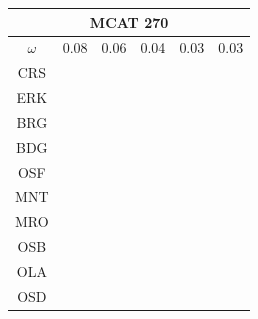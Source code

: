 \documentclass[12pt]{article}
\begin{document}
\begin{landscape}
\begin{figure}
{\begin{minipage}[c]{0.3\textwidth}
\begin{tabular}{|c|c|c|c|c|c|}
\end{tabular}
\end{minipage}
\begin{minipage}[c]{0.3\textwidth}                                                                                                                         
\begin{tabular}{|c|c|c|c|c|c|}                                                                                                        
         \hline \multicolumn{6}{|c|}{MCAT 270} \\ \hline                                                                              
         $\omega$&0.08&0.06&0.04&0.03&0.03 \\ \hline                                                                                  
        CRS&\cellcolor[HTML]{E41A1C}&\cellcolor[HTML]{E41A1C}&\cellcolor[HTML]{E41A1C}&\cellcolor[HTML]{E41A1C}&\cellcolor[HTML]{E41A1C} \\ \hline
        ERK&\cellcolor[HTML]{E41A1C}&\cellcolor[HTML]{E41A1C}&\cellcolor[HTML]{E41A1C}&\cellcolor[HTML]{E41A1C}&\cellcolor[HTML]{E41A1C} \\ \hline
        BRG&\cellcolor[HTML]{377EB8}&\cellcolor[HTML]{377EB8}&\cellcolor[HTML]{377EB8}&\cellcolor[HTML]{377EB8}&\cellcolor[HTML]{377EB8} \\ \hline       
        BDG&\cellcolor[HTML]{377EB8}&\cellcolor[HTML]{377EB8}&\cellcolor[HTML]{377EB8}&\cellcolor[HTML]{377EB8}&\cellcolor[HTML]{377EB8} \\ \hline       
        OSF&\cellcolor[HTML]{377EB8}&\cellcolor[HTML]{4DAF4A}&\cellcolor[HTML]{377EB8}&\cellcolor[HTML]{377EB8}&\cellcolor[HTML]{377EB8} \\ \hline       
        MNT&\cellcolor[HTML]{4DAF4A}&\cellcolor[HTML]{4DAF4A}&\cellcolor[HTML]{4DAF4A}&\cellcolor[HTML]{4DAF4A}&\cellcolor[HTML]{4DAF4A} \\ \hline       
        MRO&\cellcolor[HTML]{984EA3}&\cellcolor[HTML]{984EA3}&\cellcolor[HTML]{4DAF4A}&\cellcolor[HTML]{4DAF4A}&\cellcolor[HTML]{4DAF4A} \\ \hline       
        OSB&\cellcolor[HTML]{FF7F00}&\cellcolor[HTML]{984EA3}&\cellcolor[HTML]{984EA3}&\cellcolor[HTML]{4DAF4A}&\cellcolor[HTML]{4DAF4A} \\ \hline       
        OLA&\cellcolor[HTML]{FFFF33}&\cellcolor[HTML]{FF7F00}&\cellcolor[HTML]{FF7F00}&\cellcolor[HTML]{984EA3}&\cellcolor[HTML]{984EA3} \\ \hline       
        OSD&\cellcolor[HTML]{A65628}&\cellcolor[HTML]{FF7F00}&\cellcolor[HTML]{FFFF33}&\cellcolor[HTML]{FF7F00}&\cellcolor[HTML]{984EA3} \\ \hline       

\end{tabular}
\end{minipage}}
\end{figure}
\end{landscape}
\end{document}
